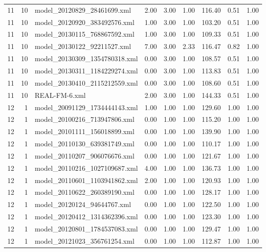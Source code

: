 \begin{table}[ht]
\begin{tabular}{rrlrrrrrr}
   11 &  10 & model\_20120829\_28461699.xml & 2.00 & 3.00 & 1.00 & 116.40 & 0.51 & 1.00 \\ 
   11 &  10 & model\_20120920\_383492576.xml & 1.00 & 3.00 & 1.00 & 103.20 & 0.51 & 1.00 \\ 
   11 &  10 & model\_20130115\_768867592.xml & 1.00 & 3.00 & 1.00 & 109.33 & 0.51 & 1.00 \\ 
   11 &  10 & model\_20130122\_92211527.xml & 7.00 & 3.00 & 2.33 & 116.47 & 0.82 & 1.00 \\ 
   11 &  10 & model\_20130309\_1354780318.xml & 0.00 & 3.00 & 1.00 & 108.57 & 0.51 & 1.00 \\ 
   11 &  10 & model\_20130311\_1184229274.xml & 0.00 & 3.00 & 1.00 & 113.83 & 0.51 & 1.00 \\ 
   11 &  10 & model\_20130410\_2115212559.xml & 0.00 & 3.00 & 1.00 & 108.60 & 0.51 & 1.00 \\ 
   11 &  10 & REAL-FM-6.xml & 2.00 & 3.00 & 1.00 & 144.33 & 0.51 & 1.00 \\ 
   12 &   1 & model\_20091129\_1734444143.xml & 1.00 & 1.00 & 1.00 & 129.60 & 1.00 & 1.00 \\ 
   12 &   1 & model\_20100216\_713947806.xml & 0.00 & 1.00 & 1.00 & 115.20 & 1.00 & 1.00 \\ 
   12 &   1 & model\_20101111\_156018899.xml & 0.00 & 1.00 & 1.00 & 139.90 & 1.00 & 1.00 \\ 
   12 &   1 & model\_20110130\_639381749.xml & 0.00 & 1.00 & 1.00 & 110.17 & 1.00 & 1.00 \\ 
   12 &   1 & model\_20110207\_906076676.xml & 0.00 & 1.00 & 1.00 & 121.67 & 1.00 & 1.00 \\ 
   12 &   1 & model\_20110216\_1027109687.xml & 4.00 & 1.00 & 1.00 & 136.73 & 1.00 & 1.00 \\ 
   12 &   1 & model\_20110601\_1103941862.xml & 2.00 & 1.00 & 1.00 & 120.93 & 1.00 & 1.00 \\ 
   12 &   1 & model\_20110622\_260389190.xml & 0.00 & 1.00 & 1.00 & 128.17 & 1.00 & 1.00 \\ 
   12 &   1 & model\_20120124\_94644767.xml & 0.00 & 1.00 & 1.00 & 122.50 & 1.00 & 1.00 \\ 
   12 &   1 & model\_20120412\_1314362396.xml & 0.00 & 1.00 & 1.00 & 123.30 & 1.00 & 1.00 \\ 
   12 &   1 & model\_20120801\_1784537083.xml & 0.00 & 1.00 & 1.00 & 129.47 & 1.00 & 1.00 \\ 
   12 &   1 & model\_20121023\_356761254.xml & 0.00 & 1.00 & 1.00 & 112.87 & 1.00 & 1.00 \\ 

\end{tabular}
\end{table}
